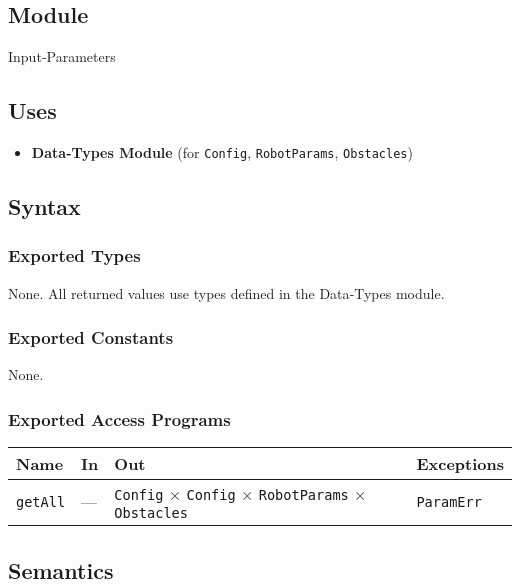 \documentclass[12pt, titlepage]{article}
\begin{document}
\subsection{Module}
Input‑Parameters

\subsection{Uses}
\begin{itemize}
  \item \textbf{Data‑Types Module} (for \texttt{Config}, \texttt{RobotParams}, \texttt{Obstacles})
\end{itemize}

\subsection{Syntax}
\subsubsection{Exported Types}
None.  All returned values use types defined in the Data‑Types module.

\subsubsection{Exported Constants}
None.

\subsubsection{Exported Access Programs}
\begin{center}
\renewcommand{\arraystretch}{1.35}
\begin{tabular}{p{3.2cm} p{5.8cm} p{3.4cm} p{3cm}}
\toprule
\textbf{Name} & \textbf{In} & \textbf{Out} & \textbf{Exceptions}\\ \midrule
\texttt{getAll} & --- & \texttt{Config} $\times$ \texttt{Config} $\times$ \texttt{RobotParams} $\times$ \texttt{Obstacles} & \texttt{ParamErr}\\
\bottomrule
\end{tabular}
\end{center}

\subsection{Semantics}
\end{document}
